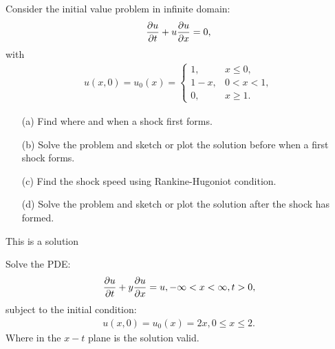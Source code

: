 \documentclass[12pt]{report}
\begin{document}


\begin{problem}
    Consider the initial value problem in infinite domain:
    \begin{align*}
        \frac{\partial u}{\partial t} + u \frac{\partial u}{\partial x} = 0,
    \end{align*}
    with
    \begin{align*}
        u(x,0) = u_0(x) = \begin{cases}
            1, &x \leq 0,\\
            1 - x, & 0<x<1,\\
            0, &x \geq 1.
        \end{cases}
    \end{align*}
    \begin{enumerate}
        \item [(a)]
        Find where and when a shock first forms.

        \item [(b)]
        Solve the problem and sketch or plot the solution before when a first shock forms. 
        
        \item [(c)]
        Find the shock speed using Rankine-Hugoniot condition.
        
        \item [(d)]
        Solve the problem and sketch or plot the solution after the shock has formed.

    \end{enumerate}
\end{problem}

\begin{solution}
    \noindent
    This is a solution
\end{solution}

\newpage



\begin{problem}
    Solve the PDE:
    \begin{align*}
        \frac{\partial u}{\partial t} + y \frac{\partial u}{\partial x} = u, - \infty < x < \infty, t > 0,
    \end{align*} 
    subject to the initial condition:
    \begin{align*}
        u(x,0) = u_0(x) = 2x, 0 \leq x \leq 2.
    \end{align*}
    Where in the $x-t$ plane is the solution valid. 
\end{problem}

\begin{solution}
    \noindent
    

\end{solution}

\newpage
\end{document}
